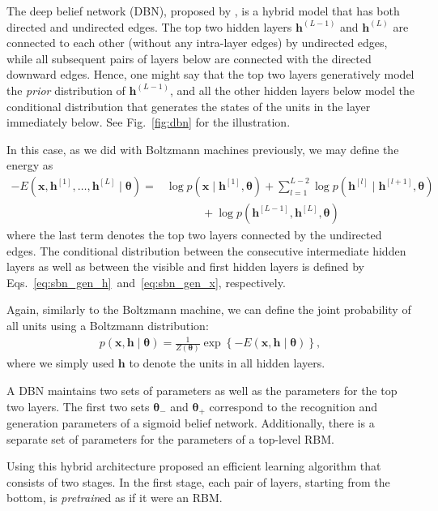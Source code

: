 \documentclass[dissertation,nocontribution,draft*]{aaltoseries}
\newcommand{\qlay}[1]{\left[#1\right]}
\newcommand{\vect}[1]{\mathbf{#1}}
\newcommand{\vects}[1]{\boldsymbol{#1}}
\newcommand{\vh}[0]{\vect{h}}
\newcommand{\vx}[0]{\vect{x}}
\newcommand{\TT}[0]{{\vects{\theta}}}
\begin{document}
The deep belief network (DBN), proposed by
\citet{Hinton2006nc}, is a hybrid model that has both
directed and undirected edges.  The top two hidden layers
$\vh^{(L-1)}$ and $\vh^{(L)}$ are connected to each other 
(without any intra-layer edges) by undirected edges,
while all subsequent pairs of layers below are connected
with the directed downward edges. Hence, one might say that
the top two layers generatively model the \textit{prior}
distribution of $\vh^{(L-1)}$, and all the other hidden layers
below model the conditional distribution that generates the
states of the units in the layer immediately below. See
Fig.~\ref{fig:dbn} for the illustration.

In this case, as we did with Boltzmann machines previously,
we may define the energy as
\begin{align}
    \label{eq:dbn_energy}
    -E(\vx, \vh^{\qlay{1}}, \dots, \vh^{\qlay{L}} \mid \TT)
    = 
    &\log p(\vx \mid \vh^{\qlay{1}}, \TT) + \sum_{l=1}^{L-2} \log
    p(\vh^{\qlay{l}} \mid \vh^{\qlay{l+1}}, \TT) 
    \nonumber \\
    &\phantom{= \log}+\log p(\vh^{\qlay{L-1}}, \vh^{\qlay{L}}, \TT) 
\end{align}
where the last term denotes the top two layers connected by
the undirected edges. The conditional distribution between
the consecutive intermediate hidden layers as well as between
the visible and first hidden layers is defined by
Eqs.~\eqref{eq:sbn_gen_h}~and~\eqref{eq:sbn_gen_x},
respectively.

Again, similarly to the Boltzmann machine, we can define the
joint probability of all units using a Boltzmann
distribution:
\begin{align*}
    p(\vx, \vh \mid \TT) = \frac{1}{Z(\TT)} \exp \left\{
    -E(\vx, \vh \mid \TT)
    \right\},
\end{align*}
where we simply used $\vh$ to denote the units in all hidden
layers.

A DBN maintains two sets of parameters as well as the
parameters for the top two layers.  The first two sets
$\TT_-$ and $\TT_+$ correspond to the recognition and
generation parameters of a sigmoid belief network.
Additionally, there is a separate set of parameters for the
parameters of a top-level RBM.

Using this hybrid architecture \citet{Hinton2006nc} proposed
an efficient learning algorithm that consists of two stages.
In the first stage, each pair of layers, starting from the
bottom, is \textit{pretrain}ed as if it were an RBM.
\end{document}
